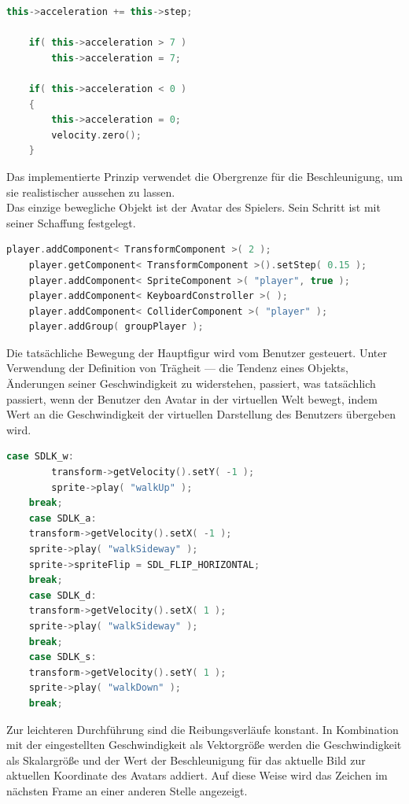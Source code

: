 \documentclass[
  10pt,
  a4paper,
  oneside,
  headers,
  headinclude,
  footinclude,
  BCOR5mm,
]{article}
\begin{document}
\begin{lstlisting}[language=C++]
    this->acceleration += this->step;

    if( this->acceleration > 7 )
        this->acceleration = 7;

    if( this->acceleration < 0 )
    {
        this->acceleration = 0;
        velocity.zero();
    }
\end{lstlisting}

Das implementierte Prinzip verwendet die Obergrenze für die Beschleunigung, um
sie realistischer aussehen zu lassen.\\
Das einzige bewegliche Objekt ist der Avatar des Spielers. Sein Schritt ist mit
seiner Schaffung festgelegt.

\begin{lstlisting}[language=C++]
    player.addComponent< TransformComponent >( 2 );
    player.getComponent< TransformComponent >().setStep( 0.15 );
    player.addComponent< SpriteComponent >( "player", true );
    player.addComponent< KeyboardConstroller >( );
    player.addComponent< ColliderComponent >( "player" );
    player.addGroup( groupPlayer );
\end{lstlisting}

Die tatsächliche Bewegung der Hauptfigur wird vom Benutzer gesteuert. Unter
Verwendung der Definition von Trägheit --- die Tendenz eines Objekts, Änderungen
seiner Geschwindigkeit zu widerstehen, passiert, was tatsächlich passiert, wenn
der Benutzer den Avatar in der virtuellen Welt bewegt, indem Wert an die
Geschwindigkeit der virtuellen Darstellung des Benutzers übergeben wird.\\

\begin{lstlisting}[language=C++]
    case SDLK_w:
        transform->getVelocity().setY( -1 );
        sprite->play( "walkUp" );
	break;
    case SDLK_a:
	transform->getVelocity().setX( -1 );
	sprite->play( "walkSideway" );
	sprite->spriteFlip = SDL_FLIP_HORIZONTAL;
	break;
    case SDLK_d:
	transform->getVelocity().setX( 1 );
	sprite->play( "walkSideway" );
	break;
    case SDLK_s:
	transform->getVelocity().setY( 1 );
	sprite->play( "walkDown" );
	break;
\end{lstlisting}

Zur leichteren Durchführung sind die Reibungsverläufe konstant. In Kombination
mit der eingestellten Geschwindigkeit als Vektorgröße werden die Geschwindigkeit
als Skalargröße und der Wert der Beschleunigung für das aktuelle Bild zur
aktuellen Koordinate des Avatars addiert. Auf diese Weise wird das Zeichen im
nächsten Frame an einer anderen Stelle angezeigt.
\end{document}
